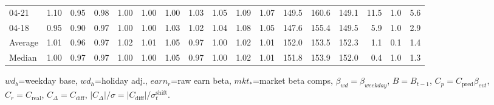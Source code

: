 \begin{threeparttable}
{\begin{tabular}{lrrrrrrrrrrrrrrrr}
  04-21 &   1.10 &   0.95 &         0.98 &     1.00 &           1.00 &        1.00 &        1.03 &        1.05 &          1.09 &          1.07 & 149.5 & 160.6 & 149.1 &       11.5 &                      1.0 &                 5.6 \\
  04-18 &   0.95 &   0.90 &         0.97 &     1.00 &           1.00 &        1.03 &        1.02 &        1.04 &          1.08 &          1.05 & 147.6 & 155.4 & 149.5 &        5.9 &                      1.0 &                 2.9 \\
Average &   1.01 &   0.96 &         0.97 &     1.02 &           1.01 &        1.05 &        0.97 &        1.00 &          1.02 &          1.01 & 152.0 & 153.5 & 152.3 &        1.1 &                      0.1 &                 1.4 \\
 Median &   1.00 &   0.97 &         0.97 &     1.00 &           1.00 &        1.05 &        0.97 &        1.00 &          1.02 &          1.01 & 151.8 & 153.9 & 152.0 &        0.4 &                      1.0 &                 1.3 \\
\bottomrule
\end{tabular}
}
\begin{tablenotes}\footnotesize
\item $wd_b$=weekday base, $wd_h$=holiday adj.,
$earn_r$=raw earn beta, $mkt_{*}$=market beta comps,
$\beta_{wd}=\beta_{weekday}$, $B=B_{t-1}$,
$C_p=C_{\text{pred}}\beta_{evt}$, $C_r=C_{\text{real}}$,
$C_\Delta=C_{\text{diff}}$, $|C_\Delta|/\sigma=|C_{\text{diff}}|/\sigma_t^{\text{shift}}$.
\end{tablenotes}
\end{threeparttable}
\endgroup
